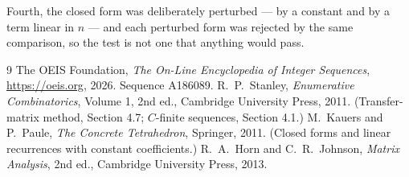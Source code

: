 \documentclass[11pt,a4paper]{article}
\theoremstyle{plain}
\theoremstyle{definition}
\begin{document}
Fourth, the closed form was deliberately perturbed --- by a constant and by a term linear in
$n$ --- and each perturbed form was rejected by the same comparison, so the test is not one
that anything would pass.

\begin{thebibliography}{9}
 The OEIS Foundation, \emph{The On-Line Encyclopedia of Integer
Sequences}, \url{https://oeis.org}, 2026. Sequence A186089.
 R.~P.~Stanley, \emph{Enumerative Combinatorics}, Volume 1, 2nd ed.,
Cambridge University Press, 2011. (Transfer-matrix method, Section 4.7; $C$-finite sequences,
Section 4.1.)
 M.~Kauers and P.~Paule, \emph{The Concrete Tetrahedron}, Springer, 2011.
(Closed forms and linear recurrences with constant coefficients.)
 R.~A.~Horn and C.~R.~Johnson, \emph{Matrix Analysis}, 2nd ed., Cambridge
University Press, 2013.
\end{thebibliography}
\end{document}
